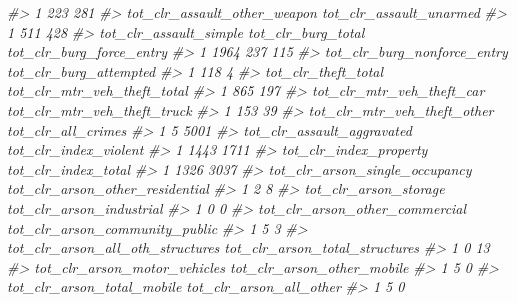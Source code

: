 \documentclass[
]{krantz}
\makeatletter
\newenvironment{Shaded}{\begin{snugshade}}{\end{snugshade}}
\newcommand{\CommentTok}[1]{\textcolor[rgb]{0.37,0.37,0.37}{\textit{#1}}}
\newenvironment{kframe}{%
\medskip{}
\setlength{\fboxsep}{.8em}
 \def\at@end@of@kframe{}%
 \ifinner\ifhmode%
  \def\at@end@of@kframe{\end{minipage}}%
  \begin{minipage}{\columnwidth}%
 \fi\fi%
 \def\FrameCommand##1{\hskip\@totalleftmargin \hskip-\fboxsep
 \colorbox{shadecolor}{##1}\hskip-\fboxsep
     \hskip-\linewidth \hskip-\@totalleftmargin \hskip\columnwidth}%
 \MakeFramed {\advance\hsize-\width
   \@totalleftmargin\z@ \linewidth\hsize
   \@setminipage}}%
 {\par\unskip\endMakeFramed%
 \at@end@of@kframe}
\renewenvironment{Shaded}{\begin{kframe}}{\end{kframe}}
\makeatother
\begin{document}
\begin{Shaded}
\begin{Highlighting}[]
\CommentTok{\#\textgreater{} 1                        223                          281}
\CommentTok{\#\textgreater{}   tot\_clr\_assault\_other\_weapon tot\_clr\_assault\_unarmed}
\CommentTok{\#\textgreater{} 1                          511                     428}
\CommentTok{\#\textgreater{}   tot\_clr\_assault\_simple tot\_clr\_burg\_total tot\_clr\_burg\_force\_entry}
\CommentTok{\#\textgreater{} 1                   1964                237                      115}
\CommentTok{\#\textgreater{}   tot\_clr\_burg\_nonforce\_entry tot\_clr\_burg\_attempted}
\CommentTok{\#\textgreater{} 1                         118                      4}
\CommentTok{\#\textgreater{}   tot\_clr\_theft\_total tot\_clr\_mtr\_veh\_theft\_total}
\CommentTok{\#\textgreater{} 1                 865                         197}
\CommentTok{\#\textgreater{}   tot\_clr\_mtr\_veh\_theft\_car tot\_clr\_mtr\_veh\_theft\_truck}
\CommentTok{\#\textgreater{} 1                       153                          39}
\CommentTok{\#\textgreater{}   tot\_clr\_mtr\_veh\_theft\_other tot\_clr\_all\_crimes}
\CommentTok{\#\textgreater{} 1                           5               5001}
\CommentTok{\#\textgreater{}   tot\_clr\_assault\_aggravated tot\_clr\_index\_violent}
\CommentTok{\#\textgreater{} 1                       1443                  1711}
\CommentTok{\#\textgreater{}   tot\_clr\_index\_property tot\_clr\_index\_total}
\CommentTok{\#\textgreater{} 1                   1326                3037}
\CommentTok{\#\textgreater{}   tot\_clr\_arson\_single\_occupancy tot\_clr\_arson\_other\_residential}
\CommentTok{\#\textgreater{} 1                              2                               8}
\CommentTok{\#\textgreater{}   tot\_clr\_arson\_storage tot\_clr\_arson\_industrial}
\CommentTok{\#\textgreater{} 1                     0                        0}
\CommentTok{\#\textgreater{}   tot\_clr\_arson\_other\_commercial tot\_clr\_arson\_community\_public}
\CommentTok{\#\textgreater{} 1                              5                              3}
\CommentTok{\#\textgreater{}   tot\_clr\_arson\_all\_oth\_structures tot\_clr\_arson\_total\_structures}
\CommentTok{\#\textgreater{} 1                                0                             13}
\CommentTok{\#\textgreater{}   tot\_clr\_arson\_motor\_vehicles tot\_clr\_arson\_other\_mobile}
\CommentTok{\#\textgreater{} 1                            5                          0}
\CommentTok{\#\textgreater{}   tot\_clr\_arson\_total\_mobile tot\_clr\_arson\_all\_other}
\CommentTok{\#\textgreater{} 1                          5                       0}

\end{Highlighting}
\end{Shaded}
\end{document}
